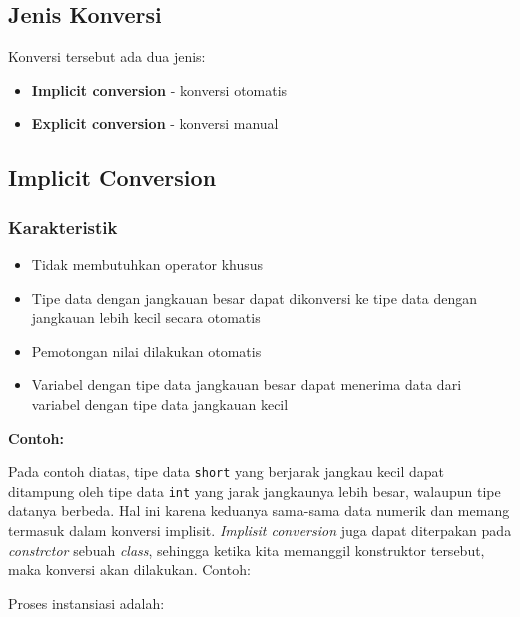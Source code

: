 \subsection{Jenis Konversi}

Konversi tersebut ada dua jenis:
\begin{itemize}
\item \textbf{Implicit conversion} - konversi otomatis
\item \textbf{Explicit conversion} - konversi manual
\end{itemize}

\subsection{Implicit Conversion}\label{implicit-conversion}

\subsubsection{Karakteristik}

\begin{itemize}
\item Tidak membutuhkan operator khusus
\item Tipe data dengan jangkauan besar dapat dikonversi ke tipe data dengan jangkauan lebih kecil secara otomatis
\item Pemotongan nilai dilakukan otomatis
\item Variabel dengan tipe data jangkauan besar dapat menerima data dari variabel dengan tipe data jangkauan kecil
\end{itemize}

\textbf{Contoh:}



Pada contoh diatas, tipe data \texttt{short} yang berjarak jangkau kecil
dapat ditampung oleh tipe data \texttt{int} yang jarak jangkaunya lebih
besar, walaupun tipe datanya berbeda. Hal ini karena keduanya sama-sama
data numerik dan memang termasuk dalam konversi implisit. \emph{Implisit
conversion} juga dapat diterpakan pada \emph{constrctor} sebuah
\emph{class}, sehingga ketika kita memanggil konstruktor tersebut, maka
konversi akan dilakukan. Contoh:



Proses instansiasi adalah:



